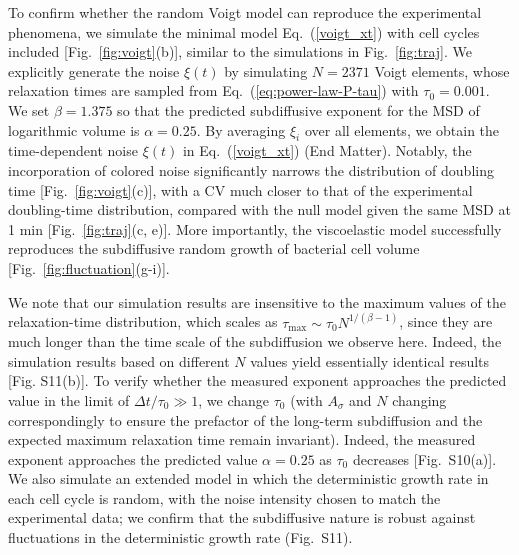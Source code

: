 \documentclass[aps, prl, twocolumn, longbibliography, linenumbers, superscriptaddress]{revtex4-2}
\begin{document}
To confirm whether the random Voigt model can reproduce the experimental phenomena, we simulate the minimal model Eq.~(\ref{voigt_xt}) with cell cycles included [Fig.~\ref{fig:voigt}(b)], similar to the simulations in Fig.~\ref{fig:traj}. We explicitly generate the noise $\xi(t)$ by simulating $N=2371$ Voigt elements, whose relaxation times are sampled from Eq.~(\ref{eq:power-law-P-tau}) with $\tau_0=0.001$. We set $\beta=1.375$ so that the predicted subdiffusive exponent for the MSD of logarithmic volume is $\alpha=0.25$. By averaging $\xi_i$ over all elements, we obtain the time-dependent noise $\xi(t)$ in Eq.~(\ref{voigt_xt}) (End Matter). Notably, the incorporation of colored noise significantly narrows the distribution of doubling time [Fig.~\ref{fig:voigt}(c)], with a CV much closer to that of the experimental doubling-time distribution, compared with the null model given the same MSD at 1 min [Fig.~\ref{fig:traj}(c, e)]. More importantly, the viscoelastic model successfully reproduces the subdiffusive random growth of bacterial cell volume [Fig.~\ref{fig:fluctuation}(g-i)].

We note that our simulation results are insensitive to the maximum values of the relaxation-time distribution, which scales as $\tau_{\max}\sim \tau_0 N^{1/(\beta-1)}$, since they are much longer than the time scale of the subdiffusion we observe here. Indeed, the simulation results based on different $N$ values yield essentially identical results [Fig. S11(b)]. To verify whether the measured exponent approaches the predicted value in the limit of $\Delta t/\tau_0\gg 1$, we change $\tau_0$ (with $A_{\sigma}$ and $N$ changing correspondingly to ensure the prefactor of the long-term subdiffusion and the expected maximum relaxation time remain invariant). Indeed, the measured exponent approaches the predicted value $\alpha=0.25$ as $\tau_0$ decreases [Fig.~S10(a)]. We also simulate an extended model in which the deterministic growth rate in each cell cycle is random, with the noise intensity chosen to match the experimental data; we confirm that the subdiffusive nature is robust against fluctuations in the deterministic growth rate (Fig.~S11).
\end{document}
